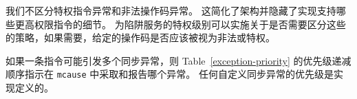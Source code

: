 \begin{commentary}
我们不区分特权指令异常和非法操作码异常。 这简化了架构并隐藏了实现支持哪些更高权限指令的细节。 为陷阱服务的特权级别可以实施关于是否需要区分这些的策略，如果需要，给定的操作码是否应该被视为非法或特权。
\end{commentary}

\iffalse
If an instruction may raise multiple synchronous exceptions, the
decreasing priority order of Table~\ref{exception-priority}
indicates which exception is taken and reported in {\tt mcause}.
The priority of any custom synchronous exceptions is implementation-defined.
\fi
如果一条指令可能引发多个同步异常，则 Table~\ref{exception-priority} 的优先级递减顺序指示在 {\tt mcause} 中采取和报告哪个异常。 任何自定义同步异常的优先级是实现定义的。

\begin{table*}[htbp]
\begin{center}
\begin{tabular}{|l|r|l|}


\end{tabular}
\end{center}
\end{table*}
